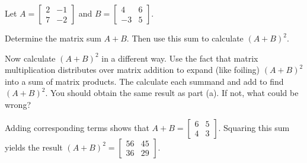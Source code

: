 \begin{example} Let $A = \left[ \begin{array}{cr} 2&-1\\7&-2 \end{array}\right]$ and $B = \left[ \begin{array}{rc} 4&6 \\ -3&5 \end{array} \right]$. 
	\ba
	\item Determine the matrix sum $A+B$. Then use this sum to calculate $(A+B)^2$. 
	
	\item Now calculate $(A+B)^2$ in a different way. Use the fact that matrix multiplication distributes over matrix addition to expand (like foiling) $(A+B)^2$ into a sum of matrix products. The calculate each summand and add to find $(A+B)^2$. You should obtain the same result as part (a). If not, what could be wrong? 
	
	\ea

\ExampleSolution	
\ba
\item Adding corresponding terms shows that $A+B = \left[ \begin{array}{cc} 6&5\\4&3 \end{array} \right]$. 
Squaring this sum yields the result $(A+B)^2 = \left[ \begin{array}{cc} 56&45 \\ 36&29 \end{array} \right]$. 


\end{example}
